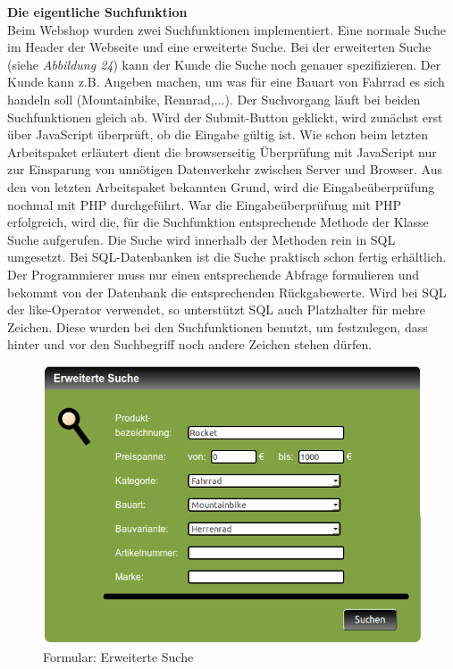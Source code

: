 \textbf{Die eigentliche Suchfunktion}\\
Beim Webshop wurden zwei Suchfunktionen implementiert. Eine \glqq normale\grqq{} Suche im Header der Webseite und eine \glqq erweiterte\grqq{} Suche. Bei der erweiterten Suche (siehe \textit{Abbildung 24}) kann der Kunde die Suche noch genauer spezifizieren. Der Kunde kann z.B. Angeben machen, um was für eine Bauart von Fahrrad es sich handeln soll (Mountainbike, Rennrad,...). Der Suchvorgang läuft bei beiden Suchfunktionen gleich ab. Wird der Submit-Button geklickt, wird zunächst erst über JavaScript überprüft, ob die Eingabe gültig ist. Wie schon beim letzten Arbeitspaket erläutert dient die browserseitig Überprüfung mit JavaScript nur zur Einsparung von unnötigen Datenverkehr zwischen Server und Browser. Aus den von letzten Arbeitspaket bekannten Grund, wird die Eingabeüberprüfung nochmal mit PHP durchgeführt. War die Eingabeüberprüfung mit PHP erfolgreich, wird die, für die Suchfunktion entsprechende Methode der Klasse \glqq Suche\grqq{} aufgerufen. Die Suche wird innerhalb der Methoden rein in SQL umgesetzt. Bei SQL-Datenbanken ist die Suche praktisch schon fertig erhältlich. Der Programmierer muss nur einen entsprechende Abfrage formulieren und bekommt von der Datenbank die entsprechenden Rückgabewerte. Wird bei SQL der \glqq like\grqq{}-Operator verwendet, so unterstützt SQL auch Platzhalter für mehre Zeichen. Diese wurden bei den Suchfunktionen benutzt, um festzulegen, dass hinter und vor den Suchbegriff noch andere Zeichen stehen dürfen.

\begin{figure}[H]
	\begin{center}
			\includegraphics[width=115mm]{Bilder/erweiterte_suche.png}
	\end{center}
	\caption{Formular: Erweiterte Suche}
\end{figure}

